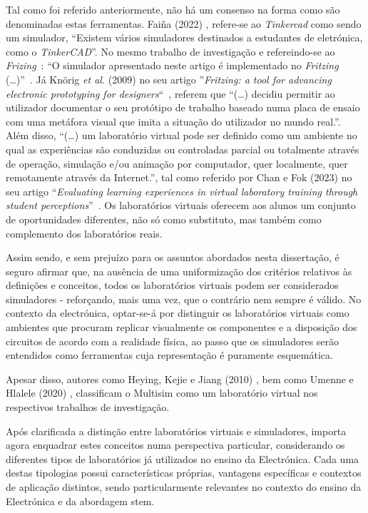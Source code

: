 Tal como foi referido anteriormente, não há um consenso na forma como são denominadas estas ferramentas. Faiña (2022) \cite{faina}, refere-se ao \textit{Tinkercad} como sendo um simulador, ``Existem vários simuladores destinados a estudantes de eletrónica, como o \textit{TinkerCAD}''. No mesmo trabalho de investigação e refereindo-se ao \textit{Frizing}~\cite{fritzingdown}: ``O simulador apresentado neste artigo é implementado no \textit{Fritzing} (\ldots)''~\cite{faina}. Já Knörig \textit{et al.} (2009) no seu artigo ''\textit{Fritzing: a tool for advancing electronic prototyping for designers}``~\cite{Knorig2009Feb}, referem que ``(\ldots) decidiu permitir ao utilizador documentar o seu protótipo de trabalho baseado numa placa de ensaio com uma metáfora visual que imita a situação do utilizador no mundo real.''. Além disso, ``(\ldots) um laboratório virtual pode ser definido como um ambiente no qual as experiências são conduzidas ou controladas parcial ou totalmente através de operação, simulação e/ou animação por computador, quer localmente, quer remotamente através da Internet.'', tal como referido por Chan e Fok (2023) no seu artigo ``\textit{Evaluating learning experiences in virtual laboratory training through student perceptions}''~\cite{EvaluatingLearningExperiencesVirtualLaboratoryHongKong}. Os laboratórios virtuais oferecem aos alunos um conjunto de oportunidades diferentes, não só como substituto, mas também como complemento dos laboratórios reais.

Assim sendo, e sem prejuízo para os assuntos abordados nesta dissertação, é seguro afirmar que, na ausência de uma uniformização dos critérios relativos às definições e conceitos, todos os laboratórios virtuais podem ser considerados simuladores - reforçando, mais uma vez, que o contrário nem sempre é válido. No contexto da electrónica, optar-se-á por distinguir os laboratórios virtuais como ambientes que procuram replicar visualmente os componentes e a disposição dos circuitos de acordo com a realidade física, ao passo que os simuladores serão entendidos como ferramentas cuja representação é puramente esquemática.

Apesar disso, autores como Heying, Kejie e Jiang (2010) \cite{multisimVLHeying}, bem como Umenne e Hlalele (2020) \cite{multisimVLUmenne}, classificam o Multisim \cite{multisim} como um laboratório virtual nos respectivos trabalhos de investigação.


Após clarificada a distinção entre laboratórios virtuais e simuladores, importa agora enquadrar estes conceitos numa perspectiva particular, considerando os diferentes tipos de laboratórios já utilizados no ensino da Electrónica. Cada uma destas tipologias possui características próprias, vantagens específicas e contextos de aplicação distintos, sendo particularmente relevantes no contexto do ensino da Electrónica e da abordagem \acrshort{stem}.

